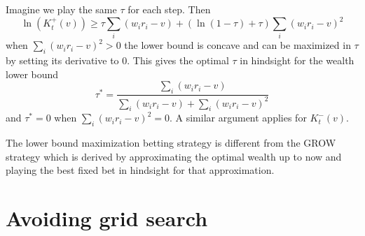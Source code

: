 Imagine we play the same $\tau$ for each step. Then
\[
\ln(K_t^+(v)) \geq \tau \sum_i (w_i r_i -v) + \left(\ln\left(1-\tau\right)+\tau\right) \sum_i (w_i r_i -v)^2
\]
when $\sum_i (w_i r_i -v)^2>0$ the lower bound is concave and can 
be maximized in $\tau$ by setting its derivative to 0. This gives
the optimal $\tau$ in hindsight for the wealth lower bound 
\[
\tau^* = \frac{\sum_i (w_i r_i -v)}{\sum_i (w_i r_i -v)+\sum_i (w_i r_i -v)^2}
\]
and $\tau^*=0$ when $\sum_i (w_i r_i -v)^2=0$. A similar argument 
applies for $K_t^-(v)$.

The lower bound maximization betting strategy is different from 
the GROW strategy \cite{waudby-smith_variance-adaptive_2020} 
which is derived by approximating the optimal wealth up to now 
and playing the best fixed bet in hindsight for that approximation.





\newpage
\appendix
\section{Avoiding grid search}

